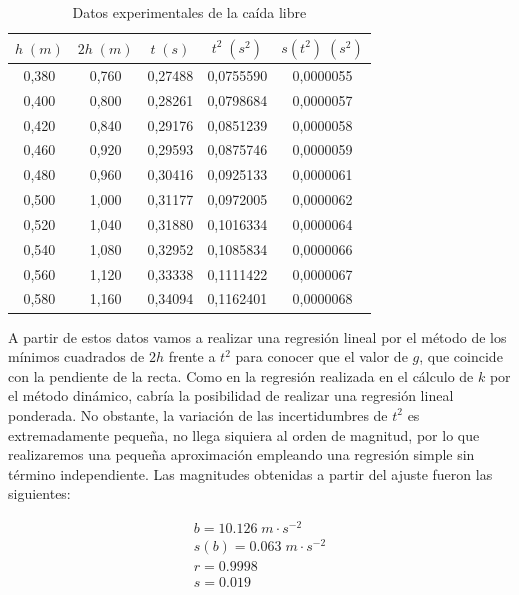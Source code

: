 \documentclass[a4paper,12pt,titlepage]{report}
\begin{document}
\begin{table}[h!]
    \centering
    \begin{tabular}{|c|c|c|c|c|}
    \hline
    $h \; (m)$ & $2h \; (m)$ & $t \; (s)$ & $t^2 \; (s^2)$ & $s(t^2) \; (s^2)$ \\ \hline
    0,380 & 0,760 & 0,27488 & 0,0755590 & 0,0000055 \\ \hline
    0,400  & 0,800  & 0,28261 & 0,0798684 & 0,0000057 \\ \hline
    0,420 & 0,840 & 0,29176 & 0,0851239 & 0,0000058 \\ \hline
    0,460 & 0,920 & 0,29593 & 0,0875746 & 0,0000059 \\ \hline
    0,480 & 0,960 & 0,30416 & 0,0925133 & 0,0000061 \\ \hline
    0,500  & 1,000    & 0,31177 & 0,0972005 & 0,0000062 \\ \hline
    0,520 & 1,040 & 0,31880  & 0,1016334  & 0,0000064 \\ \hline
    0,540 & 1,080 & 0,32952 & 0,1085834  & 0,0000066 \\ \hline
    0,560 & 1,120 & 0,33338 & 0,1111422 & 0,0000067 \\ \hline
    0,580 & 1,160 & 0,34094 & 0,1162401 & 0,0000068 \\ \hline
    \end{tabular}
    \caption{Datos experimentales de la caída libre}
    \label{Datos gravedad}
\end{table}

A partir de estos datos vamos a realizar una regresión lineal por el método de los mínimos cuadrados de $2h$ frente a $t^2$ para conocer que el valor de $g$, que coincide con la pendiente de la recta. Como en la regresión realizada en el cálculo de $k$ por el método dinámico, cabría la posibilidad de realizar una regresión lineal ponderada. No obstante, la variación de las incertidumbres de $t^2$ es extremadamente pequeña, no llega siquiera al orden de magnitud, por lo que realizaremos una pequeña aproximación empleando una regresión simple sin término independiente. Las magnitudes obtenidas a partir del ajuste fueron las siguientes:

\begin{equation}
    \begin{gathered}
        b =  10.126 \; m \cdot s^{-2} \\
        s(b) = 0.063 \; m \cdot s^{-2} \\
        r =  0.9998 \\
        s =  0.019
    \end{gathered}
\end{equation}
\end{document}
